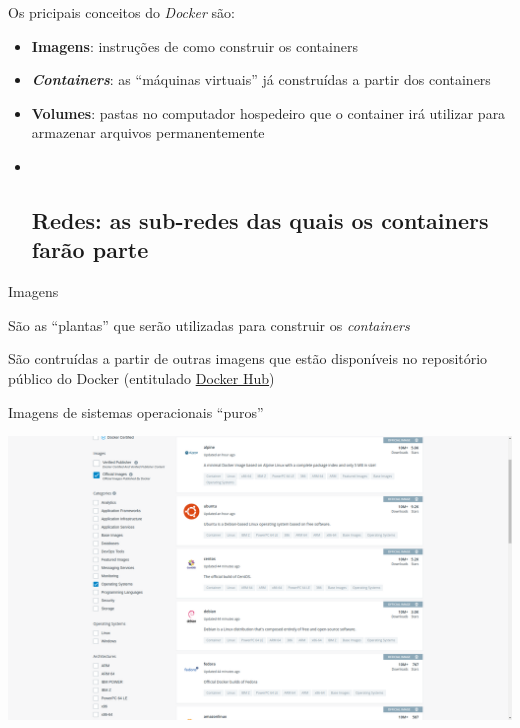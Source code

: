 \documentclass[
  ignorenonframetext,
]{beamer}
\begin{document}
\begin{frame}

Os pricipais conceitos do \emph{Docker} são:

\begin{itemize}
\item
  \textbf{Imagens}: instruções de como construir os containers
\item
  \textbf{\emph{Containers}}: as ``máquinas virtuais'' já construídas a
  partir dos containers
\item
  \textbf{Volumes}: pastas no computador hospedeiro que o container irá
  utilizar para armazenar arquivos permanentemente
\item ~
  \hypertarget{redes-as-sub-redes-das-quais-os-containers-farao-parte}{%
  \subsection{\texorpdfstring{\textbf{Redes}: as sub-redes das quais os
  containers farão
  parte}{Redes: as sub-redes das quais os containers farão parte}}\label{redes-as-sub-redes-das-quais-os-containers-farao-parte}}
\end{itemize}

\end{frame}

\begin{frame}{Imagens}
\protect\hypertarget{imagens}{}

São as ``plantas'' que serão utilizadas para construir os
\emph{containers}

\end{frame}

\begin{frame}

São contruídas a partir de outras imagens que estão disponíveis no
repositório público do Docker (entitulado
\href{http://hub.docker.com}{Docker Hub})

\end{frame}

\begin{frame}

\begin{block}{Imagens de sistemas operacionais ``puros''}

\includegraphics{img/hub-os.png}

\end{block}

\end{frame}
\end{document}
